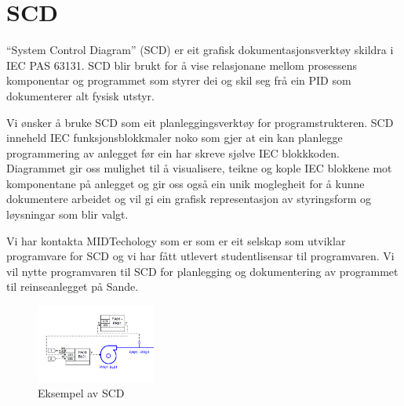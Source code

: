 \section{SCD}
\thispagestyle{fancy}


``System Control Diagram'' (\gls{SCD})  er eit grafisk dokumentasjonsverktøy skildra i \gls{IEC} \gls{PAS} 63131.\newline
 \gls{SCD} blir brukt for å vise relasjonane mellom prosessens komponentar og programmet som styrer dei og skil seg frå ein \gls{PID}
 som dokumenterer alt fysisk utstyr.

 Vi ønsker å bruke \gls{SCD} som eit planleggingsverktøy for programstrukteren. \gls{SCD} inneheld \gls{IEC} funksjonsblokkmaler noko som gjer at ein kan
 planlegge programmering av anlegget før ein har skreve sjølve \gls{IEC} blokkkoden.
 Diagrammet gir oss mulighet til å visualisere, teikne og kople \gls{IEC} blokkene mot komponentane på anlegget og 
 gir oss også ein unik moglegheit for å kunne dokumentere arbeidet og vil gi ein grafisk representasjon
 av styringsform og løysningar som blir valgt.

 Vi har kontakta MIDTechology \citep{MIDT} som er som er eit selskap som utviklar programvare for \gls{SCD} og vi har fått utlevert studentlisensar
 til programvaren. Vi vil nytte programvaren til \gls{SCD} for planlegging og dokumentering av programmet til reinseanlegget på Sande.

 \begin{figure}[htbp]
    \centering
    \includegraphics[width=0.35\textwidth]{Bilder/Visio_eksempel.png}
    \caption{Eksempel av \gls{SCD}}\label{fig:SCD eksempel}    
\end{figure}

\newpage
